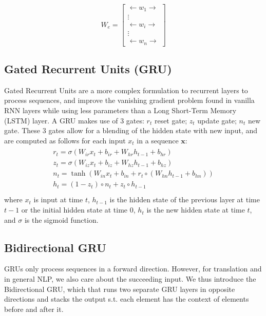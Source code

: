 \documentclass[twoside,twocolumn]{article}
\renewcommand{\vec}[1]{\mathbf{#1}}
\begin{document}
\begin{equation}
  W_e = \begin{bmatrix}
  \longleftarrow w_1 \longrightarrow \\
  \vdots\\
  \longleftarrow w_i \longrightarrow\\
  \vdots\\
  \longleftarrow w_n \longrightarrow
\end{bmatrix}
\end{equation}

\subsection{Gated Recurrent Units (GRU)}
\label{sec:gru}
Gated Recurrent Units are a more complex formulation to recurrent layers to
process sequences, and improve the vanishing gradient problem found in
vanilla RNN layers while using less parameters than a
Long Short-Term Memory (LSTM) layer\cite{grupaper}. A GRU makes use of
3 gates: $r_t$ reset gate; $z_t$ update gate; $n_t$ new gate. These 3 gates
allow for a blending of the hidden state with new input, and are computed
as follows for each input $x_t$ in a sequence $\vec{x}$:
\begin{equation}
  \begin{split}\begin{array}{ll}
  r_t = \sigma(W_{ir} x_t + b_{ir} + W_{hr} h_{t-1} + b_{hr}) \\
  z_t = \sigma(W_{iz} x_t + b_{iz} + W_{hz} h_{t-1} + b_{hz}) \\
  n_t = \tanh(W_{in} x_t + b_{in} + r_t \circ (W_{hn} h_{t-1}+ b_{hn})) \\
  h_t = (1 - z_t) \circ n_t + z_t \circ h_{t-1} \\
  \end{array}\end{split}
\end{equation}
where $x_t$ is input at time $t$, $h_{t-1}$ is the hidden state of the
previous layer at time $t-1$ or the initial hidden state at time $0$, $h_t$
is the new hidden state at time $t$, and $\sigma$ is the sigmoid function.
\subsection{Bidirectional GRU}
\label{sec:bidirectional}

GRUs only process sequences in a forward direction. However, for
translation and in general NLP, we also care about the succeeding input.
We thus introduce the Bidirectional GRU, which that runs two separate GRU
layers in opposite directions and stacks the output s.t. each element has
the context of elements before and after it.
\end{document}
